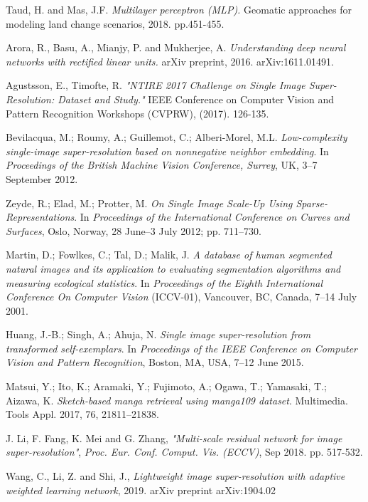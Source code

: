 \documentclass[twocolumn]{svjour3}          %
\begin{document}
\begin{thebibliography}{00}
 Taud, H. and Mas, J.F. \textit{Multilayer perceptron (MLP).} Geomatic approaches for modeling land change scenarios, 2018.  pp.451-455.

 Arora, R., Basu, A., Mianjy, P. and Mukherjee, A. \textit{Understanding deep neural networks with rectified linear units.} arXiv preprint, 2016. arXiv:1611.01491.

 Agustsson, E.,  Timofte, R. \textit{"NTIRE 2017 Challenge on Single Image Super-Resolution: Dataset and Study."} IEEE Conference on Computer Vision and Pattern Recognition Workshops (CVPRW), (2017). 126-135.

 Bevilacqua, M.; Roumy, A.; Guillemot, C.; Alberi-Morel, M.L. \textit{Low-complexity single-image super-resolution based on nonnegative neighbor embedding}. In \textit{Proceedings of the British Machine Vision Conference, Surrey}, UK, 3–7 September 2012.

 Zeyde, R.; Elad, M.; Protter, M. \textit{On Single Image Scale-Up Using Sparse-Representations}. In \textit{Proceedings of the International Conference on Curves and Surfaces}, Oslo, Norway, 28 June–3 July 2012; pp. 711–730.

 Martin, D.; Fowlkes, C.; Tal, D.; Malik, J. \textit{A database of human segmented natural images and its application to evaluating segmentation algorithms and measuring ecological statistics}. In \textit{Proceedings of the Eighth International Conference On Computer Vision} (ICCV-01), Vancouver, BC, Canada, 7–14 July 2001.

 Huang, J.-B.; Singh, A.; Ahuja, N. \textit{Single image super-resolution from transformed self-exemplars}. In \textit{Proceedings of the IEEE Conference on Computer Vision and Pattern Recognition}, Boston, MA, USA, 7–12 June 2015.

 Matsui, Y.; Ito, K.; Aramaki, Y.; Fujimoto, A.; Ogawa, T.; Yamasaki, T.; Aizawa, K. \textit{Sketch-based manga retrieval using manga109 dataset}. Multimedia. Tools Appl. 2017, 76, 21811–21838.

 J. Li, F. Fang, K. Mei and G. Zhang, \textit{"Multi-scale residual network for image super-resolution"}, \textit{Proc. Eur. Conf. Comput. Vis. (ECCV)}, Sep 2018. pp. 517-532.

 Wang, C., Li, Z. and Shi, J., \textit{Lightweight image super-resolution with adaptive weighted learning network}, 2019. arXiv preprint arXiv:1904.02


\end{thebibliography}
\end{document}
